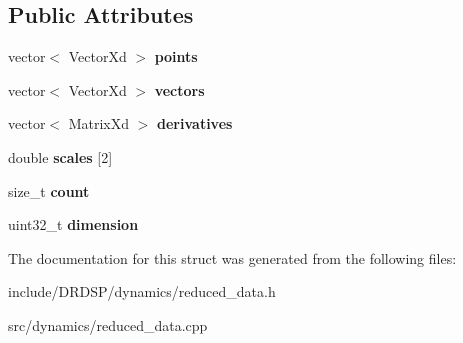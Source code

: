 \subsection*{Public Attributes}
\begin{DoxyCompactItemize}
\item 
\hypertarget{struct_d_r_d_s_p_1_1_reduced_data_abd8c77d4f236d3d070877ce0fba784ea}{vector$<$ Vector\-Xd $>$ {\bfseries points}}\label{struct_d_r_d_s_p_1_1_reduced_data_abd8c77d4f236d3d070877ce0fba784ea}

\item 
\hypertarget{struct_d_r_d_s_p_1_1_reduced_data_a73865908c2b66ef58976c979ffc7362d}{vector$<$ Vector\-Xd $>$ {\bfseries vectors}}\label{struct_d_r_d_s_p_1_1_reduced_data_a73865908c2b66ef58976c979ffc7362d}

\item 
\hypertarget{struct_d_r_d_s_p_1_1_reduced_data_aefd68b7db76c0b15c848c7a9d2801fbd}{vector$<$ Matrix\-Xd $>$ {\bfseries derivatives}}\label{struct_d_r_d_s_p_1_1_reduced_data_aefd68b7db76c0b15c848c7a9d2801fbd}

\item 
\hypertarget{struct_d_r_d_s_p_1_1_reduced_data_ab96e3e52f0f3645ed735c01739b565bb}{double {\bfseries scales} \mbox{[}2\mbox{]}}\label{struct_d_r_d_s_p_1_1_reduced_data_ab96e3e52f0f3645ed735c01739b565bb}

\item 
\hypertarget{struct_d_r_d_s_p_1_1_reduced_data_af37223a7bdac263102f238a5f61df873}{size\-\_\-t {\bfseries count}}\label{struct_d_r_d_s_p_1_1_reduced_data_af37223a7bdac263102f238a5f61df873}

\item 
\hypertarget{struct_d_r_d_s_p_1_1_reduced_data_ab1afd073659db487a0480121e8f64199}{uint32\-\_\-t {\bfseries dimension}}\label{struct_d_r_d_s_p_1_1_reduced_data_ab1afd073659db487a0480121e8f64199}

\end{DoxyCompactItemize}


The documentation for this struct was generated from the following files\-:\begin{DoxyCompactItemize}
\item 
include/\-D\-R\-D\-S\-P/dynamics/reduced\-\_\-data.\-h\item 
src/dynamics/reduced\-\_\-data.\-cpp\end{DoxyCompactItemize}
